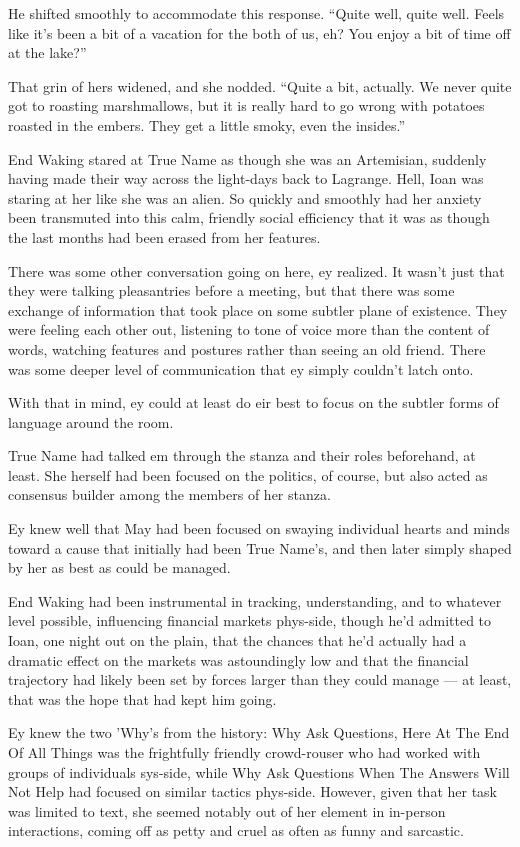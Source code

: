 He shifted smoothly to accommodate this response. ``Quite well, quite well. Feels like it's been a bit of a vacation for the both of us, eh? You enjoy a bit of time off at the lake?''

That grin of hers widened, and she nodded. ``Quite a bit, actually. We never quite got to roasting marshmallows, but it is really hard to go wrong with potatoes roasted in the embers. They get a little smoky, even the insides.''

End Waking stared at True Name as though she was an Artemisian, suddenly having made their way across the light-days back to Lagrange. Hell, Ioan was staring at her like she was an alien. So quickly and smoothly had her anxiety been transmuted into this calm, friendly social efficiency that it was as though the last months had been erased from her features.

There was some other conversation going on here, ey realized. It wasn't just that they were talking pleasantries before a meeting, but that there was some exchange of information that took place on some subtler plane of existence. They were feeling each other out, listening to tone of voice more than the content of words, watching features and postures rather than seeing an old friend. There was some deeper level of communication that ey simply couldn't latch onto.

With that in mind, ey could at least do eir best to focus on the subtler forms of language around the room.

True Name had talked em through the stanza and their roles beforehand, at least. She herself had been focused on the politics, of course, but also acted as consensus builder among the members of her stanza.

Ey knew well that May had been focused on swaying individual hearts and minds toward a cause that initially had been True Name's, and then later simply shaped by her as best as could be managed.

End Waking had been instrumental in tracking, understanding, and to whatever level possible, influencing financial markets phys-side, though he'd admitted to Ioan, one night out on the plain, that the chances that he'd actually had a dramatic effect on the markets was astoundingly low and that the financial trajectory had likely been set by forces larger than they could manage — at least, that was the hope that had kept him going.

Ey knew the two 'Why's from the history: Why Ask Questions, Here At The End Of All Things was the frightfully friendly crowd-rouser who had worked with groups of individuals sys-side, while Why Ask Questions When The Answers Will Not Help had focused on similar tactics phys-side. However, given that her task was limited to text, she seemed notably out of her element in in-person interactions, coming off as petty and cruel as often as funny and sarcastic.

